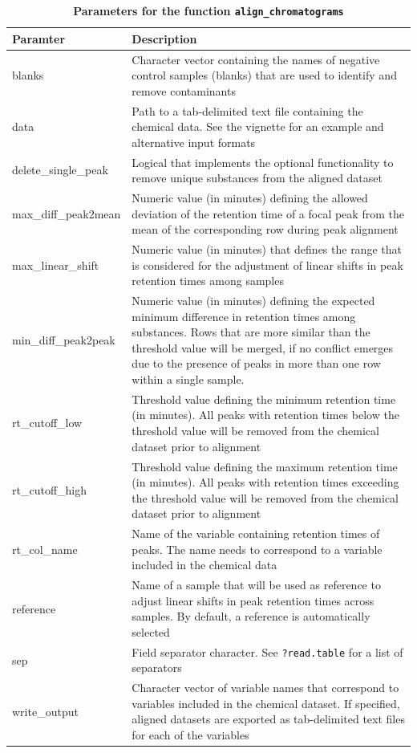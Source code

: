 \documentclass[10pt,letterpaper]{article}
\begin{document}
\begin{table}[!ht]
\begin{adjustwidth}{-2.25in}{0in} %
\centering
\caption{\textbf{Parameters for the function \texttt{align\_chromatograms}}}
\label{table:table1}
\begin{tabular}{|p{3cm}|p{14cm}|} 
\hline
\textbf{Paramter} & \textbf{Description} \\ \hline
blanks & Character vector containing the names of negative control samples (blanks) that are used to identify and remove contaminants \\
\hline
data & Path to a tab-delimited text file containing the chemical data. See the vignette for an example and alternative input formats \\
\hline
delete\_single\_peak & Logical that implements the optional functionality to remove unique substances from the aligned dataset \\
\hline
max\_diff\_peak2mean & Numeric value (in minutes) defining the allowed deviation of the retention time of a focal peak from the mean of the corresponding row during peak alignment \\
\hline
max\_linear\_shift & Numeric value (in minutes) that defines the range that is considered for the adjustment of linear shifts in peak retention times among samples \\
\hline
min\_diff\_peak2peak & Numeric value (in minutes) defining the expected minimum difference in retention times among substances. Rows that are more similar than the threshold value will be merged, if no conflict emerges due to the presence of peaks in more than one row within a single sample. \\
\hline
rt\_cutoff\_low & Threshold value defining the minimum retention time (in minutes). All peaks with retention times below the threshold value will be removed from the chemical dataset prior to alignment\\
\hline
rt\_cutoff\_high & Threshold value defining the maximum retention time (in minutes). All peaks with retention times exceeding the threshold value will be removed from the chemical dataset prior to alignment\\
\hline
rt\_col\_name & Name of the variable containing retention times of peaks. The name needs to correspond to a variable included in the chemical data \\
\hline
reference & Name of a sample that will be used as reference to adjust linear shifts in peak retention times across samples. By default, a reference is automatically selected\\ 
\hline
sep & Field separator character. See \texttt{?read.table} for a list of separators\\
\hline
write\_output & Character vector of variable names that correspond to variables included in the chemical  dataset. If specified, aligned datasets are exported as tab-delimited text files for each of the variables\\
\hline
\end{tabular}
\end{adjustwidth}
\end{table}
\end{document}
